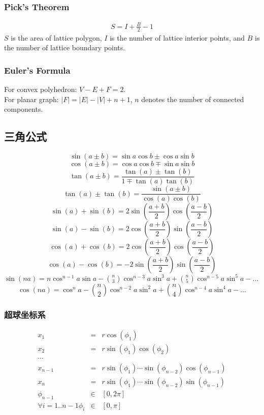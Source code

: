 \begin{small}
\begin{spacing}{0.5}
\subsubsection{Pick's Theorem}
\begin{eqnarray*}
S=I+\frac{B}{2}-1
\end{eqnarray*}
$S$ is the area of lattice polygon, $I$ is the number of lattice interior points, and $B$ is the number of lattice boundary points.
\subsubsection{Euler's Formula}
For convex polyhedron: $V-E+F=2$. \\
For planar graph: $|F|=|E|-|V|+n+1$, $n$ denotes the number of connected components.
\subsection{三角公式}
\noindent
\[
\sin(a \pm b) = \sin a \cos b \pm \cos a \sin b
\]
\[
\cos(a \pm b) = \cos a \cos b \mp \sin a \sin b
\]
\[
\tan(a \pm b) = \frac{\tan(a)\pm\tan(b)}{1 \mp \tan(a)\tan(b)}
\]
\[
\tan(a) \pm \tan(b) = \frac{\sin(a \pm b)}{\cos(a)\cos(b)}
\]
\[
\sin(a) + \sin(b) = 2\sin(\frac{a + b}{2})\cos(\frac{a - b}{2})
\]
\[
\sin(a) - \sin(b) = 2\cos(\frac{a + b}{2})\sin(\frac{a - b}{2})
\]
\[
\cos(a) + \cos(b) = 2\cos(\frac{a + b}{2})\cos(\frac{a - b}{2})
\]
\[
\cos(a) - \cos(b) = -2\sin(\frac{a + b}{2})\sin(\frac{a - b}{2})
\]
$
\sin(na) = n\cos^{n-1}a\sin a - \binom{n}{3}\cos^{n-3}a \sin^3a + \binom{n}{5}\cos^{n-5}a\sin^5a - \dots
$
\[
\cos(na) = \cos^{n}a - \binom{n}{2}\cos^{n-2}a \sin^2a + \binom{n}{4}\cos^{n-4}a\sin^4a - \dots
\]
\subsubsection{超球坐标系}
\begin{eqnarray*}
 	x_1 &=& r\cos(\phi_1) \\ 
	x_2 &=& r\sin(\phi_1)\cos(\phi_2) \\
	\cdots\\
	x_{n-1} &=& r\sin(\phi_1)\cdots\sin(\phi_{n-2})\cos(\phi_{n-1}) \\
	x_n &=& r\sin(\phi_1)\cdots\sin(\phi_{n-2})\sin(\phi_{n-1}) \\
	\phi_{n-1} &\in& [0,2\pi]\\
	\forall {i=1..{n-1}}\phi_i &\in& [0,\pi]\\
\end{eqnarray*}

\end{spacing}
\end{small}

